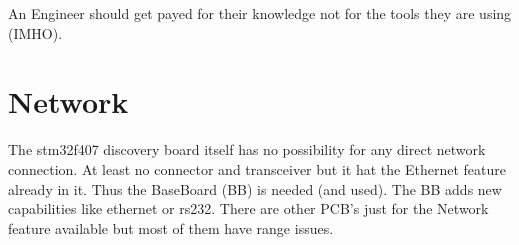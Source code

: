 An Engineer should get payed for their knowledge not for the tools they are using (IMHO).

\section{Network}
The stm32f407 discovery board itself has no possibility for any direct network connection.
At least no connector and transceiver but it hat the Ethernet feature already in it.
Thus the BaseBoard (BB) is needed (and used). The BB adds new capabilities like ethernet
or rs232.
There are other PCB's just for the Network feature available but most of them have range issues.
